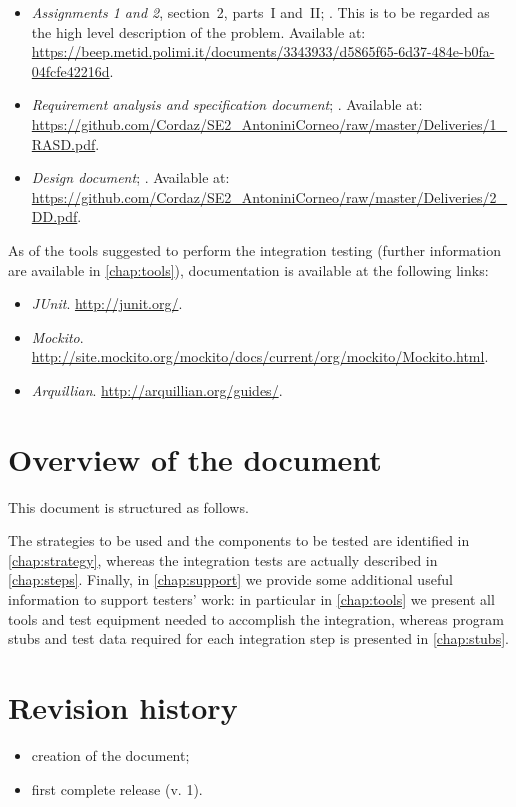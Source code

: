 \begin{itemize}
	\item \emph{Assignments 1 and 2}, section~2, parts~I and~II; . This is to be regarded as the high level description of the problem. Available at: \url{https://beep.metid.polimi.it/documents/3343933/d5865f65-6d37-484e-b0fa-04fcfe42216d}.
	
	\item \emph{Requirement analysis and specification document}; . Available at: \url{https://github.com/Cordaz/SE2_AntoniniCorneo/raw/master/Deliveries/1_RASD.pdf}.
	
	\item \emph{Design document}; . Available at: \url{https://github.com/Cordaz/SE2_AntoniniCorneo/raw/master/Deliveries/2_DD.pdf}.
\end{itemize}


As of the tools suggested to perform the integration testing (further information are available in \cref{chap:tools}), documentation is available at the following links:

\begin{itemize}
	\item \emph{JUnit}. \url{http://junit.org/}.
	\item \emph{Mockito}. \url{http://site.mockito.org/mockito/docs/current/org/mockito/Mockito.html}.
	\item \emph{Arquillian}. \url{http://arquillian.org/guides/}.
\end{itemize}



\section{Overview of the document} 
This document is structured as follows. 

The strategies to be used and the components to be tested are identified in \cref{chap:strategy}, whereas the integration tests are actually described in \cref{chap:steps}. Finally, in \cref{chap:support} we provide some additional useful information to support testers' work: in particular in \cref{chap:tools} we present all tools and test equipment needed to accomplish the integration, whereas program stubs and test data required for each integration step is presented in \cref{chap:stubs}.



\section{Revision history}
\begin{itemize}
	\item {} creation of the document;
	\item {} first complete release (v. 1).
\end{itemize}




